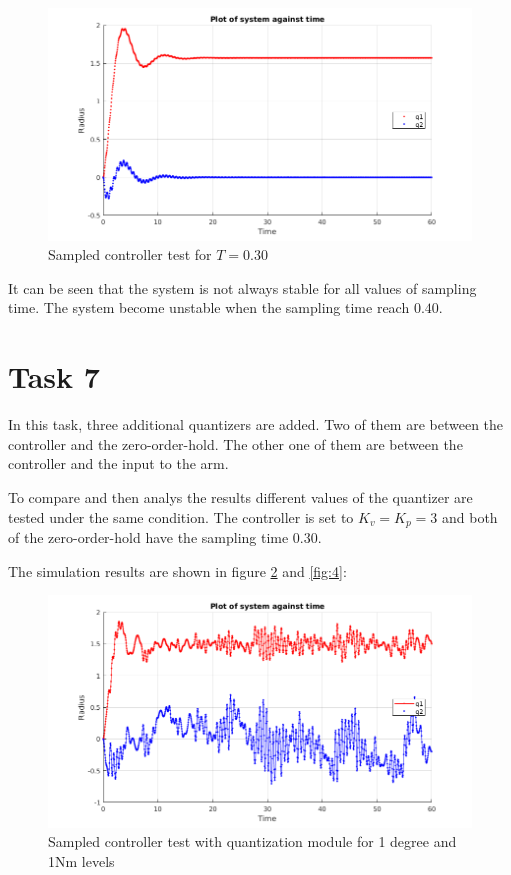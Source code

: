 \documentclass[a4paper,12pt,oneside,onecolumn]{article} %
\begin{document}
\begin{figure}[ht]
    \centering
    \includegraphics[scale=0.4]{zoh_30.png}
    \caption{Sampled controller test for $T=0.30$}
    \label{fig:2}
\end{figure} 


It can be seen that the system is not always stable for all values of sampling time. The system become unstable when the sampling time reach $0.40$. 

\section*{Task 7}
In this task, three additional quantizers are added. Two of them are between the controller and the zero-order-hold. The other one of them are between the controller and the input to the arm. 

To compare and then analys the results different values of the quantizer are tested under the same condition. The controller is set to $K_v = K_p =3$ and both of the zero-order-hold have the sampling time $0.30$. 

The simulation results are shown in figure \ref{fig:3} and \ref{fig:4}:

\begin{figure}[ht]
    \centering
    \includegraphics[scale=0.4]{quant_1_1.png}
    \caption{Sampled controller test with quantization module for 1 degree and 1Nm levels}
    \label{fig:3}
\end{figure} 
\end{document}
